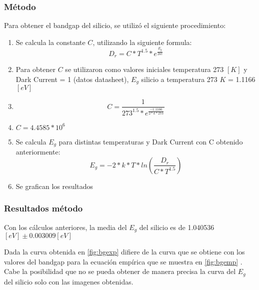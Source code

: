 \documentclass[a4paper,10pt]{article}
\begin{document}
\subsubsection{Método}
Para obtener el bandgap del silicio, se utilizó el siguiente procedimiento:
\begin{enumerate}
\item Se calcula la constante $C$, utilizando la siguiente formula: $$ D_r = C*T^{1.5}*e^{\frac{E_g}{2kt}}$$
\item Para obtener $C$ se utilizaron como valores iniciales temperatura 273 $[K]$ y Dark Current = 1 (datos datasheet), $E_g$ silicio a temperatura 273 $K$ = 1.1166 $[eV]$
\item $$C = \frac{1}{273^{1.5}*e^{\frac{-1.1166}{2*k*273}}}$$
\item $C = 4.4585*10^6$
\item Se calcula $E_g$ para distintas temperaturas y Dark Current con C obtenido anteriormente: $$E_g = -2*k*T*ln(\frac{D_r}{C*T^{1.5}})$$
\item Se grafican los resultados
\end{enumerate}
\subsubsection{Resultados método}
Con los cálculos anteriores, la media del $E_g$ del silicio es de 1.040536 $[eV] \pm 0.003009 [eV]$

Dada la curva obtenida en \ref{fig:bgexp} difiere de la curva que se obtiene
con los valores del bandgap para la ecuación empírica que se muestra en
\ref{fig:bgemp} . Cabe la posibilidad que no se pueda obtener de manera precisa
la curva del $E_g$ del silicio solo con las imagenes obtenidas.
\newpage
\end{document}
